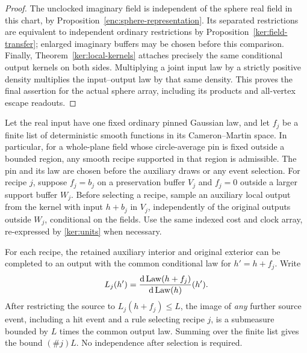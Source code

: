 \begin{proof}
The unclocked imaginary field is independent of the sphere real
field in this chart, by Proposition~\ref{enc:sphere-representation}.
Its separated restrictions are equivalent to independent ordinary
restrictions by Proposition~\ref{ker:field-transfer}; enlarged
imaginary buffers may be chosen before this comparison.  Finally,
Theorem~\ref{ker:local-kernels} attaches precisely the same conditional
output kernels on both sides.  Multiplying a joint input law by a
strictly positive density multiplies the input--output law by that
same density.  This proves the final assertion for the actual sphere
array, including its products and all-vertex escape readouts.
\end{proof}

\begin{lemma}
\label{ker:selected-transfer}
Let the real input have one fixed ordinary pinned Gaussian law, and
let \(f_j\) be a finite list of deterministic smooth functions in its
Cameron--Martin space. In particular, for a whole-plane field whose
circle-average pin is fixed outside a bounded region, any smooth
recipe supported in that region is admissible. The pin and its law
are chosen before the auxiliary draws or any event selection.
For recipe \(j\), suppose \(f_j=b_j\) on a preservation buffer
\(V_j\) and \(f_j=0\) outside a larger support buffer \(W_j\).
Before selecting a recipe, sample an auxiliary local output from the
kernel with input \(h+b_j\) in \(V_j\), independently of the original
outputs outside \(W_j\), conditional on the fields.  Use the same
indexed cost and clock array, re-expressed by \eqref{ker:units} when
necessary.

For each recipe, the retained auxiliary interior and original exterior
can be completed to an output with the common conditional law for
\(h'=h+f_j\).  Write
\[
 L_j(h')=\frac{\mathrm d\operatorname{Law}(h+f_j)}{\mathrm d\operatorname{Law}(h)}(h').
\]
After restricting the source to \(L_j(h+f_j)\le L\), the image of
\emph{any} further source event, including a hit event and a rule
selecting recipe \(j\), is a submeasure bounded by \(L\) times the
common output law.  Summing over the finite list gives the bound
\((\#j)L\).  No independence after selection is required.
\end{lemma}

